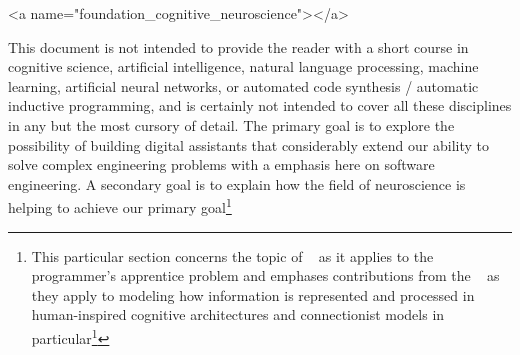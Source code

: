 
\rawhtml
<a name="foundation_cognitive_neuroscience"></a>
\endrawhtml
{}


This document is not intended to provide the reader with a short course in cognitive science, artificial intelligence, natural language processing, machine learning, artificial neural networks, or automated code synthesis / automatic inductive programming, and is certainly not intended to cover all these disciplines in any but the most cursory of detail. The primary goal is to explore the possibility of building digital assistants that considerably extend our ability to solve complex engineering problems with a emphasis here on software engineering. A secondary goal is to explain how the field of neuroscience is helping to achieve our primary goal\footnote{%
%
  This particular section concerns the topic of {}~\cite{Brachmanetal2004} as it applies to the programmer's apprentice problem and emphases contributions from the {}~\cite{Gazzaniga2009} as they apply to modeling how information is represented and processed in human-inspired cognitive architectures and connectionist models in particular\footnote{%
%
  The phrases {}~\cite{Brachmanetal2004} and {}~\cite{Gazzaniga2009} refer to important long-standing areas of study, each with their respective academic departments, national and international conferences and large numbers of advocates and adepts. Mentioning them both in the same breath could be orthodoxy or heresy depending on the context and the company you keep, but both disciplines \emdash{} it could be argued that each one might be better characterized as a constellation of specialized disciplines\footnote{%
%
}}}
